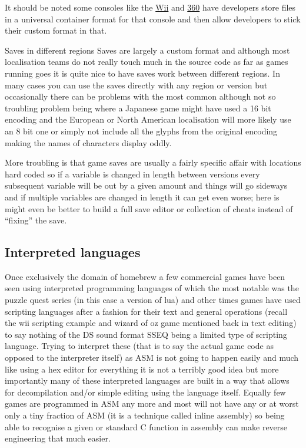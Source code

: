 \documentclass[
]{book}
\begin{document}
It should be noted some consoles like the \href{http://wiibrew.org/wiki/Savegame_Files}{Wii} and \href{http://free60.org/STFS}{360} have developers store files in a universal container format for that console and then allow developers to stick their custom format in that.

Saves in different regions Saves are largely a custom format and although most localisation teams do not really touch much in the source code as far as games running goes it is quite nice to have saves work between different regions. In many cases you can use the saves directly with any region or version but occasionally there can be problems with the most common although not so troubling problem being where a Japanese game might have used a 16 bit encoding and the European or North American localisation will more likely use an 8 bit one or simply not include all the glyphs from the original encoding making the names of characters display oddly.

More troubling is that game saves are usually a fairly specific affair with locations hard coded so if a variable is changed in length between versions every subsequent variable will be out by a given amount and things will go sideways and if multiple variables are changed in length it can get even worse; here is might even be better to build a full save editor or collection of cheats instead of ``fixing'' the save.

\hypertarget{interpreted-languages}{%
\subsection{Interpreted languages}\label{interpreted-languages}}

Once exclusively the domain of homebrew a few commercial games have been seen using interpreted programming languages of which the most notable was the puzzle quest series (in this case a version of lua) and other times games have used scripting languages after a fashion for their text and general operations (recall the wii scripting example and wizard of oz game mentioned back in text editing) to say nothing of the DS sound format SSEQ being a limited type of scripting language. Trying to interpret these (that is to say the actual game code as opposed to the interpreter itself) as ASM is not going to happen easily and much like using a hex editor for everything it is not a terribly good idea but more importantly many of these interpreted languages are built in a way that allows for decompilation and/or simple editing using the language itself. Equally few games are programmed in ASM any more and most will not have any or at worst only a tiny fraction of ASM (it is a technique called inline assembly) so being able to recognise a given or standard C function in assembly can make reverse engineering that much easier.
\end{document}
